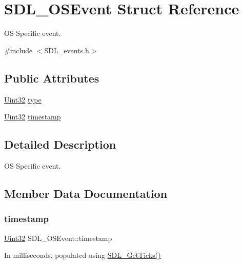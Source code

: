 \hypertarget{struct_s_d_l___o_s_event}{}\section{S\+D\+L\+\_\+\+O\+S\+Event Struct Reference}
\label{struct_s_d_l___o_s_event}


OS Specific event.  




{\ttfamily \#include $<$S\+D\+L\+\_\+events.\+h$>$}

\subsection*{Public Attributes}
\begin{DoxyCompactItemize}
\item 
\hyperlink{_s_d_l__stdinc_8h_add440eff171ea5f55cb00c4a9ab8672d}{Uint32} \hyperlink{struct_s_d_l___o_s_event_a85a600619ebebc8db007fc757b3895a5}{type}
\item 
\hyperlink{_s_d_l__stdinc_8h_add440eff171ea5f55cb00c4a9ab8672d}{Uint32} \hyperlink{struct_s_d_l___o_s_event_a8b2480eefadad9f3f8c94f8e550b7fb0}{timestamp}
\end{DoxyCompactItemize}


\subsection{Detailed Description}
OS Specific event. 

\subsection{Member Data Documentation}
\mbox{\label{struct_s_d_l___o_s_event_a8b2480eefadad9f3f8c94f8e550b7fb0}} 
\subsubsection{\texorpdfstring{timestamp}{timestamp}}
{\footnotesize\ttfamily \hyperlink{_s_d_l__stdinc_8h_add440eff171ea5f55cb00c4a9ab8672d}{Uint32} S\+D\+L\+\_\+\+O\+S\+Event\+::timestamp}

In milliseconds, populated using \hyperlink{_s_d_l__timer_8h_a0b9bc71d6287e0ffafdc3419760fe2b3}{S\+D\+L\+\_\+\+Get\+Ticks()} \mbox{\label{struct_s_d_l___o_s_event_a85a600619ebebc8db007fc757b3895a5}} 
